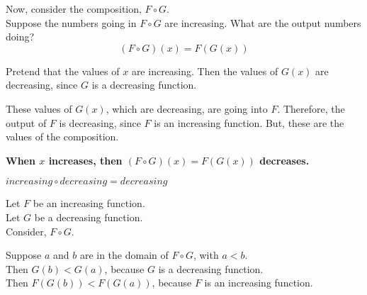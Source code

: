 \documentclass{ximera}
\begin{document}
Now, consider the composition, $F \circ G$. \\


Suppose the numbers going in $F \circ G$ are increasing.  What are the output numbers doing? \\




\[ (F \circ G)(x) = F(G(x)) \]


Pretend that the values of $x$ are increasing. Then the values of $G(x)$ are decreasing, since $G$ is a decreasing function.

These values of $G(x)$, which are decreasing, are going into $F$.  Therefore, the output of $F$ is decreasing, since $F$ is an increasing function.  But, these are the values of the composition.


\begin{center}
\textbf{\textcolor{red!70!black}{When $x$ increases, then $(F \circ G)(x) = F(G(x))$ decreases.}}
\end{center}



\begin{fact}
$increasing \circ decreasing = decreasing$


Let $F$ be an increasing function. \\
Let $G$ be a decreasing function. \\


Consider, $F \circ G$.

Suppose $a$ and $b$ are in the domain of $F \circ G$, with $a < b$. \\

Then $G(b) < G(a)$, because $G$ is a decreasing function. \\

Then $F(G(b)) < F(G(a))$, because $F$ is an increasing function.


\end{fact}
\end{document}
